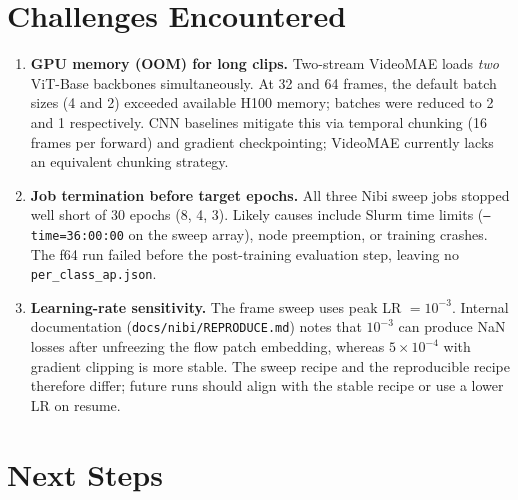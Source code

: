 \documentclass[11pt,a4paper]{article}
\begin{document}
\section{Challenges Encountered}

\begin{enumerate}[leftmargin=*]

  \item \textbf{GPU memory (OOM) for long clips.}
  Two-stream VideoMAE loads \emph{two} ViT-Base backbones simultaneously. At 32 and 64
  frames, the default batch sizes (4 and 2) exceeded available H100 memory; batches were
  reduced to 2 and 1 respectively. CNN baselines mitigate this via temporal chunking
  (16 frames per forward) and gradient checkpointing; VideoMAE currently lacks an
  equivalent chunking strategy.

  \item \textbf{Job termination before target epochs.}
  All three Nibi sweep jobs stopped well short of 30 epochs (8, 4, 3). Likely causes
  include Slurm time limits (\texttt{--time=36:00:00} on the sweep array), node
  preemption, or training crashes. The f64 run failed before the post-training evaluation
  step, leaving no \texttt{per\_class\_ap.json}.

  \item \textbf{Learning-rate sensitivity.}
  The frame sweep uses peak LR $= 10^{-3}$. Internal documentation
  (\texttt{docs/nibi/REPRODUCE.md}) notes that $10^{-3}$ can produce NaN losses after
  unfreezing the flow patch embedding, whereas $5 \times 10^{-4}$ with gradient clipping
  is more stable. The sweep recipe and the reproducible recipe therefore differ; future
  runs should align with the stable recipe or use a lower LR on resume.
  
\end{enumerate}

\section{Next Steps}
\end{document}
